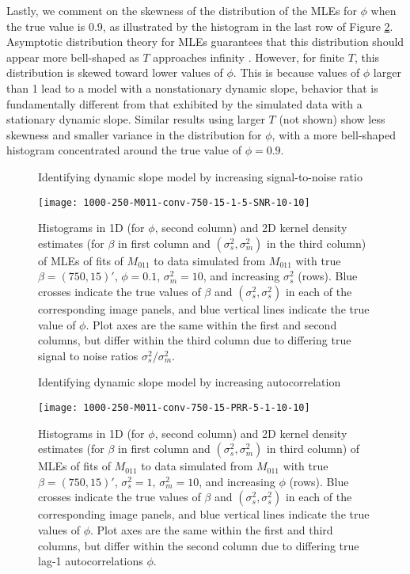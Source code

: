 Lastly, we comment on the skewness of the distribution of the MLEs for $\phi$ when the true value is 0.9, as illustrated by the histogram in the last row of Figure \ref{fig:fmri:id:M011PRR}. Asymptotic distribution theory for MLEs guarantees that this distribution should appear more bell-shaped as $T$ approaches infinity \citep[Section 10.1]{casella:berger:2002}. However, for finite $T$, this distribution is skewed toward lower values of $\phi$. This is because values of $\phi$ larger than 1 lead to a model with a nonstationary dynamic slope, behavior that is fundamentally different from that exhibited by the simulated data with a stationary dynamic slope. Similar results using larger $T$ (not shown) show less skewness and smaller variance in the distribution for $\phi$, with a more bell-shaped histogram concentrated around the true value of $\phi = 0.9$.

\begin{figure}
\ssp
\centering
\caption{Identifying dynamic slope model by increasing signal-to-noise ratio} \label{fig:fmri:id:M011SNR}
\texttt{[image: 1000-250-M011-conv-750-15-1-5-SNR-10-10]}
\caption*{Histograms in 1D (for $\phi$, second column) and 2D kernel density estimates (for $\beta$ in first column and $(\sigma^2_s,\sigma^2_m)$ in the third column) of MLEs of fits of $M_{011}$ to data simulated from $M_{011}$ with true $\beta = (750,15)'$, $\phi = 0.1$, $\sigma^2_m = 10$, and increasing $\sigma^2_s$ (rows). Blue crosses indicate the true values of $\beta$ and $(\sigma^2_s,\sigma^2_s)$ in each of the corresponding image panels, and blue vertical lines indicate the true value of $\phi$. Plot axes are the same within the first and second columns, but differ within the third column due to differing true signal to noise ratios $\sigma^2_s / \sigma^2_m$.}
\end{figure}

\begin{figure}
\ssp
\centering
\caption{Identifying dynamic slope model by increasing autocorrelation} \label{fig:fmri:id:M011PRR}
\texttt{[image: 1000-250-M011-conv-750-15-PRR-5-1-10-10]}
\caption*{Histograms in 1D (for $\phi$, second column) and 2D kernel density estimates (for $\beta$ in first column and $(\sigma^2_s,\sigma^2_m)$ in third column) of MLEs of fits of $M_{011}$ to data simulated from $M_{011}$ with true $\beta = (750,15)'$, $\sigma^2_s = 1$, $\sigma^2_m = 10$, and increasing $\phi$ (rows). Blue crosses indicate the true values of $\beta$ and $(\sigma^2_s,\sigma^2_s)$ in each of the corresponding image panels, and blue vertical lines indicate the true values of $\phi$. Plot axes are the same within the first and third columns, but differ within the second column due to differing true lag-1 autocorrelations $\phi$.}
\end{figure}

